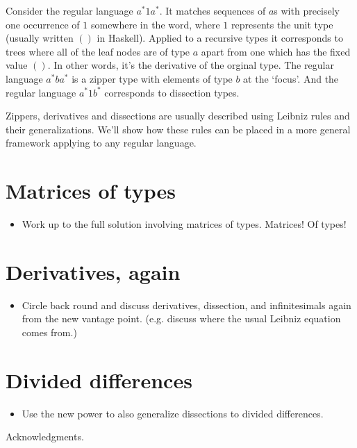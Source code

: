 \documentclass[authoryear,preprint]{sigplanconf}
\newcommand{\Varid}[1]{\mathit{#1}}
\begin{document}
Consider the regular language $a^\ast1a^\ast$. It matches sequences of $a$s with precisely one occurrence of $1$ somewhere in the word, where $1$ represents the unit type (usually written \ensuremath{()} in Haskell). Applied to a recursive types it corresponds to trees where all of the leaf nodes are of type \ensuremath{\Varid{a}} apart from one which has the fixed value \ensuremath{()}. In other words, it's the derivative of the orginal type. The regular language $a^\ast ba^\ast$ is a zipper type with elements of type $b$ at the `focus'. And the regular language $a^\ast1b^\ast$ corresponds to dissection types.

Zippers, derivatives and dissections are usually described using Leibniz rules and their generalizations. We'll show how these rules can be placed in a more general framework applying to any regular language.

\section{Matrices of types}
\label{sec:matrices-of-types}

\begin{itemize}
\item Work up to the full solution involving matrices of types.
  Matrices!  Of types!
\end{itemize}

\section{Derivatives, again}
\label{sec:derivatives-again}

\begin{itemize}
\item Circle back round and discuss derivatives, dissection, and
  infinitesimals again from the new vantage point.  (e.g. discuss
  where the usual Leibniz equation comes from.)
\end{itemize}

\section{Divided differences}
\label{sec:divided-differences}

\begin{itemize}
\item Use the new power to also generalize dissections to divided
  differences.
\end{itemize}

\acks

Acknowledgments.



\end{document}
